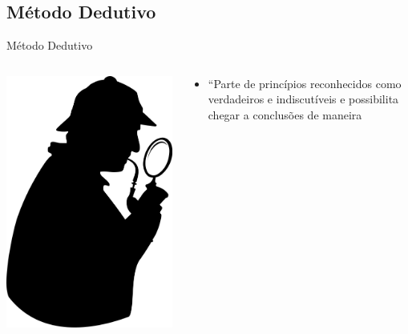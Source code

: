 \documentclass{beamer}
\begin{document}
\subsection{Método Dedutivo}

\begin{frame}{Método Dedutivo}
  \begin{columns}
    \begin{column}{3cm}
    \includegraphics[width=\textwidth]{sherlock_holmes}
    \end{column}
    \begin{column}{7.5cm}
      \begin{itemize}
      \item ``Parte de princípios reconhecidos como verdadeiros e
        indiscutíveis e possibilita chegar a conclusões de maneira

\end{itemize}
\end{column}
\end{columns}
\end{frame}
\end{document}
